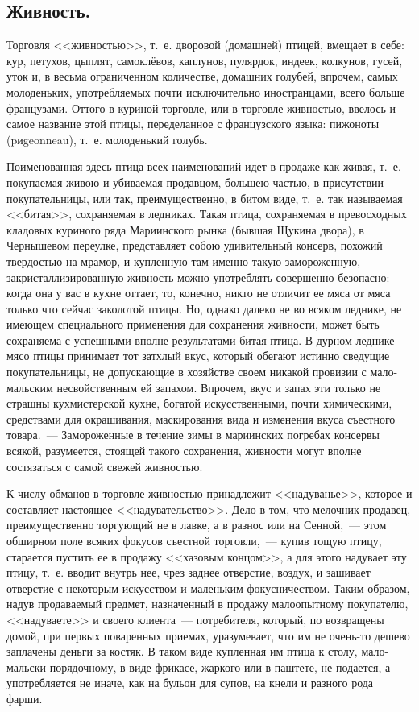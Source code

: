 \subsection{Живность.}
Торговля <<живностью>>, т.~е. дворовой (домашней) птицей, вмещает в себе: кур, петухов, цыплят, самоклёвов, каплунов, пулярдок, индеек, колкунов, гусей, уток и, в весьма ограниченном количестве, домашних голубей, впрочем, самых молоденьких, употребляемых почти исключительно иностранцами, всего больше французами. Оттого в куриной торговле, или в торговле живностью, ввелось и самое название этой птицы, переделанное с французского языка: пижоноты (pиgeonneau), т.~е. молоденький голубь.

Поименованная здесь птица всех наименований идет в продаже как живая, т.~е. покупаемая живою и убиваемая продавцом, большею частью, в присутствии покупательницы, или так, преимущественно, в битом виде, т.~е. так называемая <<битая>>, сохраняемая в ледниках. Такая птица, сохраняемая в превосходных кладовых куриного ряда Мариинского рынка (бывшая Щукина двора), в Чернышевом переулке, представляет собою удивительный консерв, похожий твердостью на мрамор, и купленную там именно такую замороженную, закристаллизированную живность можно употреблять совершенно безопасно: когда она у вас в кухне оттает, то, конечно, никто не отличит ее мяса от мяса только что сейчас заколотой птицы. Но, однако далеко не во всяком леднике, не имеющем специального применения для сохранения живности, может быть сохраняема с успешными вполне результатами битая птица. В дурном леднике мясо птицы принимает тот затхлый вкус, который обегают истинно сведущие покупательницы, не допускающие в хозяйстве своем никакой провизии с мало-мальским несвойственным ей запахом. Впрочем, вкус и запах эти только не страшны кухмистерской кухне, богатой искусственными, почти химическими, средствами для окрашивания, маскирования вида и изменения вкуса съестного товара.~--- Замороженные в течение зимы в мариинских погребах консервы всякой, разумеется, стоящей такого сохранения, живности могут вполне состязаться с самой свежей живностью.

К числу обманов в торговле живностью принадлежит <<надуванье>>, которое и составляет настоящее <<надувательство>>. Дело в том, что мелочник-продавец, преимущественно торгующий не в лавке, а в разнос или на Сенной,~--- этом обширном поле всяких фокусов съестной торговли,~--- купив тощую птицу, старается пустить ее в продажу <<хазовым концом>>, а для этого надувает эту птицу, т.~е. вводит внутрь нее, чрез заднее отверстие, воздух, и зашивает отверстие с некоторым искусством и маленьким фокусничеством. Таким образом, надув продаваемый предмет, назначенный в продажу малоопытному покупателю, <<надуваете>> и своего клиента~--- потребителя, который, по возвращены домой, при первых поваренных приемах, уразумевает, что им не очень-то дешево заплачены деньги за костяк. В таком виде купленная им птица к столу, мало-мальски порядочному, в виде фрикасе, жаркого или в паштете, не подается, а употребляется не иначе, как на бульон для супов, на кнели и разного рода фарши.

